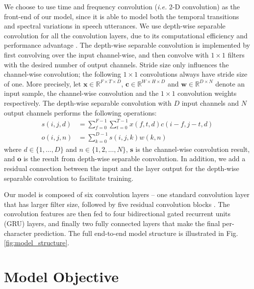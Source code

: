 \documentclass{article}
\newcommand{\ie}{\emph{i.e.}\xspace}
\begin{document}
We choose to use time and frequency convolution (\ie 2-D convolution) as the front-end of our model, since it is able to model both the temporal transitions and spectral variations in speech utterances. We use depth-wise separable convolution \cite{sifre2013rotation, chollet2016xception} for all the convolution layers, due to its computational efficiency and performance advantage \cite{chollet2016xception}. The depth-wise separable convolution is implemented by first convolving over the input channel-wise, and then convolve with $1\times1$ filters with the desired number of output channels. Stride size only influences the channel-wise convolution; the following $1\times 1$ convolutions always have stride size of one. More precisely, let $\mathbf{x} \in \mathbb{R}^{F\times T\times D}$, $\mathbf{c} \in \mathbb{R}^{W \times H \times D}$ and $\mathbf{w} \in \mathbb{R}^{D \times N}$ denote an input sample, the channel-wise convolution and the $1\times 1$ convolution weights respectively. The depth-wise separable convolution with $D$ input channels and $N$ output channels performs the following operations:
\begin{align}
s(i,j,d) &= \sum_{f=0}^{F-1}\sum_{t=0}^{T-1} x(f,t,d) c(i-f,j-t,d) \\
o(i,j,n) &= \sum_{k=0}^{D-1} s(i,j,k) w(k,n) 
\end{align}
where $d \in\{1,\ldots,D\}$ and $n \in \{1,2,\ldots,N\}$, $\mathbf{s}$ is the channel-wise convolution result, and $\mathbf{o}$ is the result from depth-wise separable convolution.
In addition, we add a residual connection \cite{he2016deep} between the input and the layer output for the depth-wise separable convolution to facilitate training. 


Our model is composed of six convolution layers -- one standard convolution layer that has larger filter size, followed by five residual convolution blocks \cite{he2016deep}.
The convolution features are then fed to four bidirectional gated recurrent units (GRU) \cite{cho2014properties} layers, and finally two fully connected layers that make the final per-character prediction. The full end-to-end model structure is illustrated in Fig. \ref{fig:model_structure}.


\section{Model Objective}
\end{document}
